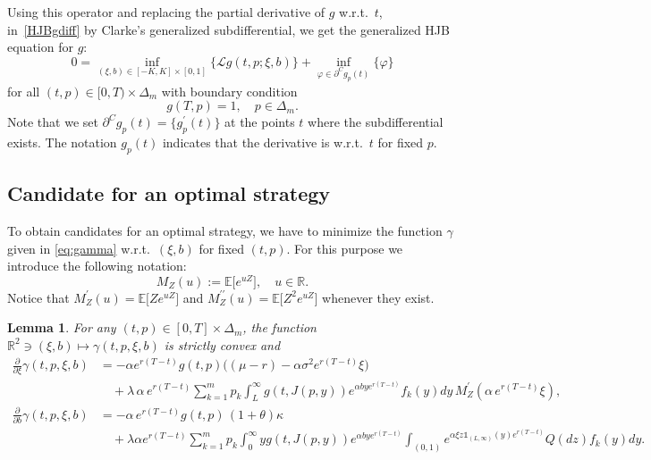 \documentclass[reqno, 11pt]{amsart}%
\newcommand{\R}{\mathbb{R}}
\newcommand{\Eop}{\mathbb{E}}
\newtheorem{lemma}[theorem]{Lemma}
\theoremstyle{definition}
\numberwithin{equation}{section} \numberwithin{theorem}{section}
\begin{document}
Using this operator and replacing the partial derivative of $g$ w.r.t.\ $t$,  in~\eqref{HJBgdiff} by Clarke's generalized subdifferential, we get the generalized HJB equation for $g$:
\begin{equation}\label{HJBg}
0 = \inf_{(\xi,b)\in[-K,K]\times[0,1]}\big\{ {\mathcal L} g(t,p;\xi,b)\big\} + \inf_{\varphi\in\partial^C\! g_p(t)}\{\varphi\}
\end{equation}
for all $(t,p)\in[0,T)\times\Delta_m$ with boundary condition
\begin{equation}\label{HJBgbound}
g(T,p) = 1,\quad p\in\Delta_m.
\end{equation}
Note that  we set $\partial^C\! g_p(t)=\{g_p^\prime(t)\}$ at the points $t$ where the subdifferential exists.
The notation $g_p(t)$ indicates that the derivative is w.r.t.\ $t$ for fixed $p$.

\subsection{Candidate for an optimal strategy}
To obtain candidates for an optimal strategy, we have to minimize the function $\gamma$ given in \eqref{eq:gamma} w.r.t.\ $(\xi,b)$ for fixed $(t,p)$.
For this purpose we introduce the following notation:
\begin{equation*}
  M_Z(u) := \Eop\big[e^{uZ}\big], \quad u\in\R.
\end{equation*}
Notice that $M_Z^\prime(u)=\Eop\big[Z e^{uZ}\big]$ and $M_Z^{\prime\prime}(u)=\Eop\big[Z^2e^{uZ}\big]$ whenever they exist.

\begin{lemma}\label{gamma}
	For any $(t,p)\in[0,T]\times\Delta_m$, the function $\R^2\ni (\xi,b)\mapsto \gamma(t,p,\xi,b)$ is strictly convex and
	\begin{align*}
	\frac{\partial}{\partial \xi}\gamma(t,p,\xi,b) &= -\alpha e^{r(T-t)}g(t,p)\big((\mu-r)-\alpha\sigma^2 e^{r(T-t)}\xi\big) \\
   &\quad + \lambda\,\alpha\,e^{r(T-t)}\sum_{k=1}^m p_k \int_L^\infty g(t,J(p,y))e^{\alpha b y e^{r(T-t)}}f_k(y)dy\,M_Z^\prime(\alpha\,e^{r(T-t)}\xi),\\
   \frac{\partial}{\partial b}\gamma(t,p,\xi,b) &= -\alpha\,e^{r(T-t)}g(t,p)\,(1+\theta)\kappa \\
   &\quad + \lambda\alpha e^{r(T-t)}\sum_{k=1}^m p_k\!\!\int_0^\infty\!\!\! yg(t,J(p,y))e^{\alpha b y e^{r(T-t)}}\!\!\int_{(0,1)}\!\!\!e^{\alpha \xi z\mathds{1}_{(L,\infty)}(y) e^{r(T-t)}}Q(dz)f_k(y)dy.
	\end{align*}
\end{lemma}
\end{document}
